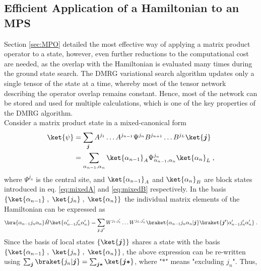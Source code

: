 \subsection{Efficient Application of a Hamiltonian to an MPS}
Section \ref{sec:MPO} detailed the most effective way of applying a matrix product operator to a state, however, even further reductions to the computational cost are needed, as the overlap with the Hamiltonian is evaluated many times during the ground state search. The DMRG variational search algorithm updates only a single tensor of the state at a time, whereby most of the tensor network describing the operator overlap remains constant. Hence, most of the network can be stored and used for multiple calculations, which is one of the key properties of the DMRG algorithm.\\ 
Consider a matrix product state in a mixed-canonical form
\begin{align}
	\ket{\psi} &= \sum_{\boldsymbol{j}} A^{j_1} \ldots A^{j_{n-1}} \Psi^{j_n} B^{j_{n+1}} \ldots B^{j_{L}} \ket{\boldsymbol{j}} \nonumber \\
	&= \sum_{\alpha_{n-1} , \alpha_{n}} \ket{\alpha_{n-1}}_A \Psi_{\alpha_{n-1} , \alpha_{n}}^{j_n}  \ket{\alpha_{n}}_L \; ,
	\label{eq:MPSmixedsingle}
\end{align}
where $\Psi^{j_n}$ is the central site, and $\ket{\alpha_{n-1}}_A$ and $\ket{\alpha_{n}}_B$ are block states introduced in eq. \eqref{eq:mixedA} and \eqref{eq:mixedB} respectively. In the basis $\{ \ket{\alpha_{n-1} } \; , \; \ket{ j_n } \; , \; \ket{\alpha_{n} } \}$ the individual matrix elements of the Hamiltonian can be expressed as
\begin{equation*}
	\bra{\alpha_{n-1} j_n \alpha_{n}} \hat{H} \ket{\alpha_{n-1} ' j_n ' \alpha_{n} '} = \sum_{\boldsymbol{j} , \boldsymbol{j'}}  W^{j_1 , j_1 '} \ldots W^{j_L , j_L '}  \braket{\alpha_{n-1} j_n \alpha_{n} | \boldsymbol{j}} \braket{\boldsymbol{j'} | \alpha_{n-1} ' j_n ' \alpha_{n} '} \; . 
\end{equation*}
Since the basis of local states $\{ \ket{\boldsymbol{j}} \}$ shares a state with the basis $\{ \ket{\alpha_{n-1} } \; , \; \ket{ j_n } \; , \; \ket{\alpha_{n} } \}$, the above expression can be re-written using $\sum_{\boldsymbol{j}} \braket{j_n | \boldsymbol{j}} = \sum_{\boldsymbol{j *}} \ket{ \boldsymbol{j *}}$, where "$\boldsymbol{*}$" means "excluding $j_n$". Thus,
